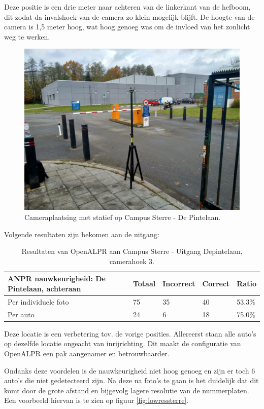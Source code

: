 Deze positie is een drie meter naar achteren van de linkerkant van de hefboom, dit zodat da invalshoek van de camera zo klein mogelijk blijft. De hoogte van de camera is 1,5 meter hoog, wat hoog genoeg was om de invloed van het zonlicht weg te werken.
\begin{figure}[h!]
	\centering
	\includegraphics[width=0.8\linewidth]{img/depintelaanstatief.jpg}
	\caption{Cameraplaatsing met statief op Campus Sterre - De Pintelaan.}
	\label{plaatsingdepintelaan}
\end{figure}

Volgende resultaten zijn bekomen aan de uitgang:
\begin{table}[h!]
	\centering
	\begin{tabular}{l|l|l|l|l}
		\textbf{ANPR nauwkeurigheid: De Pintelaan, achteraan} & Totaal & Incorrect & Correct & Ratio	\\ \hline
		Per individuele foto 	& 75 & 35	& 40	& 53.3\%\\
		Per auto				& 24 & 6	& 18 	& 75.0\%\\
	\end{tabular}
\caption{Resultaten van OpenALPR aan Campus Sterre - Uitgang Depintelaan, camerahoek 3.}
\label{tab:alprdepintelaan3}
\end{table}

Deze locatie is een verbetering tov. de vorige posities. Allereerst staan alle auto's op dezelfde locatie ongeacht van inrijrichting. Dit maakt de configuratie van OpenALPR een pak aangenamer en betrouwbaarder.

Ondanks deze voordelen is de nauwkeurigheid niet hoog genoeg en zijn er toch 6 auto's die niet gedetecteerd zijn. Na deze na foto's te gaan is het duidelijk dat dit komt door de grote afstand en bijgevolg lagere resolutie van de nummerplaten. Een voorbeeld hiervan is te zien op figuur \ref{fig:lowressterre}.

